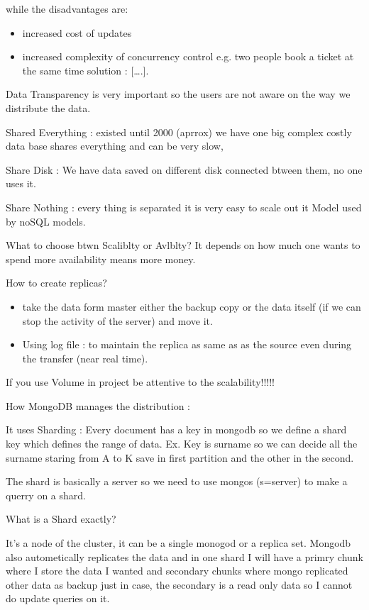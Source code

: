 \documentclass[a4page, 11pt]{article}
\begin{document}
while the disadvantages are:

\begin{itemize}[noitemsep]
	 
	\item
	increased cost of updates
	\item
	increased complexity of concurrency control e.g. two people book a
	ticket at the same time solution : {[}\ldots{}.{]}.
\end{itemize}

Data Transparency is very important so the users are not aware on the
way we distribute the data.

Shared Everything : existed until 2000 (aprrox) we have one big complex
costly data base shares everything and can be very slow,

Share Disk : We have data saved on different disk connected btween them,
no one uses it.

Share Nothing : every thing is separated it is very easy to scale out it
Model used by noSQL models.

What to choose btwn Scaliblty or Avlblty? It depends on how much one
wants to spend more availability means more money.

How to create replicas?
\begin{itemize}[noitemsep]
	\item take the data form master either the backup copy or the data itself	(if we can stop the activity of the server) and move it.
	\item Using log file : to maintain the replica as same as as the source even during the transfer (near real time).
\end{itemize}



If you use Volume in project be attentive to the scalability!!!!!

How MongoDB manages the distribution :

It uses Sharding : Every document has a key in mongodb so we define a
shard key which defines the range of data. Ex. Key is surname so we can
decide all the surname staring from A to K save in first partition and
the other in the second.

The shard is basically a server so we need to use mongos (s=server) to
make a querry on a shard.

What is a Shard exactly?

It's a node of the cluster, it can be a single monogod or a replica set.
Mongodb also autometically replicates the data and in one shard I will
have a primry chunk where I store the data I wanted and secondary chunks
where mongo replicated other data as backup just in case, the secondary
is a read only data so I cannot do update queries on it.
\end{document}
